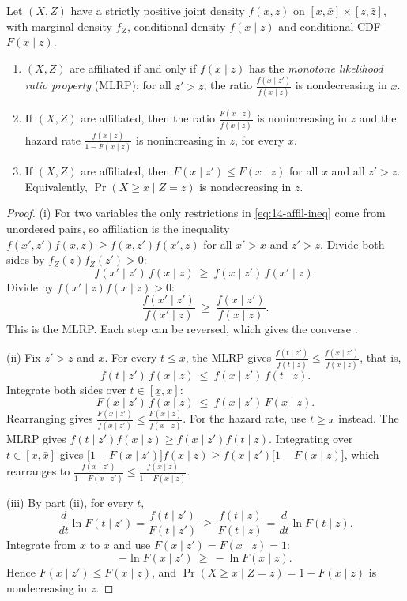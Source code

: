 \begin{proposition}\label{prop:14-affil-mlrp}
Let $(X,Z)$ have a strictly positive joint density $f(x,z)$ on $[\underline x,\bar x]\times[\underline z,\bar
z]$, with marginal density $f_Z$, conditional density $f(x\mid z)$ and conditional CDF $F(x\mid z)$.
\begin{enumerate}[label=(\roman*)]
  \item $(X,Z)$ are affiliated if and only if $f(x\mid z)$ has the \emph{monotone likelihood ratio property}
  (MLRP): for all $z'>z$, the ratio $\frac{f(x\mid z')}{f(x\mid z)}$ is nondecreasing in $x$.
  \item If $(X,Z)$ are affiliated, then the ratio $\frac{F(x\mid z)}{f(x\mid z)}$ is nonincreasing in $z$
  and the hazard rate $\frac{f(x\mid z)}{1-F(x\mid z)}$ is nonincreasing in $z$, for every $x$.
  \item If $(X,Z)$ are affiliated, then $F(x\mid z')\le F(x\mid z)$ for all $x$ and all $z'>z$. Equivalently,
  $\Pr(X\ge x\mid Z=z)$ is nondecreasing in $z$.
\end{enumerate}
\end{proposition}

\begin{proof}
(i) For two variables the only restrictions in \eqref{eq:14-affil-ineq} come from unordered pairs, so
affiliation is the inequality $f(x',z')f(x,z)\ge f(x,z')f(x',z)$ for all $x'>x$ and $z'>z$. Divide both
sides by $f_Z(z)f_Z(z')>0$:
\[
f(x'\mid z')\,f(x\mid z)\ \ge\ f(x\mid z')\,f(x'\mid z).
\]
Divide by $f(x'\mid z)f(x\mid z)>0$:
\[
\frac{f(x'\mid z')}{f(x'\mid z)}\ \ge\ \frac{f(x\mid z')}{f(x\mid z)}.
\]
This is the MLRP. Each step can be reversed, which gives the converse \citep[footnote~16]{MilgromWeber1982}.

(ii) Fix $z'>z$ and $x$. For every $t\le x$, the MLRP gives $\frac{f(t\mid z')}{f(t\mid z)}\le\frac{f(x\mid
z')}{f(x\mid z)}$, that is,
\[
f(t\mid z')\,f(x\mid z)\ \le\ f(x\mid z')\,f(t\mid z).
\]
Integrate both sides over $t\in[\underline x,x]$:
\[
F(x\mid z')\,f(x\mid z)\ \le\ f(x\mid z')\,F(x\mid z).
\]
Rearranging gives $\frac{F(x\mid z')}{f(x\mid z')}\le\frac{F(x\mid z)}{f(x\mid z)}$. For the hazard rate,
use $t\ge x$ instead. The MLRP gives $f(t\mid z')f(x\mid z)\ge f(x\mid z')f(t\mid z)$. Integrating over
$t\in[x,\bar x]$ gives $\bigl[1-F(x\mid z')\bigr]f(x\mid z)\ge f(x\mid z')\bigl[1-F(x\mid z)\bigr]$, which
rearranges to $\frac{f(x\mid z')}{1-F(x\mid z')}\le\frac{f(x\mid z)}{1-F(x\mid z)}$.

(iii) By part (ii), for every $t$,
\[
\frac{d}{dt}\ln F(t\mid z')=\frac{f(t\mid z')}{F(t\mid z')}\ \ge\ \frac{f(t\mid z)}{F(t\mid z)}=\frac{d}{dt}\ln
F(t\mid z).
\]
Integrate from $x$ to $\bar x$ and use $F(\bar x\mid z')=F(\bar x\mid z)=1$:
\[
-\ln F(x\mid z')\ \ge\ -\ln F(x\mid z).
\]
Hence $F(x\mid z')\le F(x\mid z)$, and $\Pr(X\ge x\mid Z=z)=1-F(x\mid z)$ is nondecreasing in $z$.
\end{proof}

